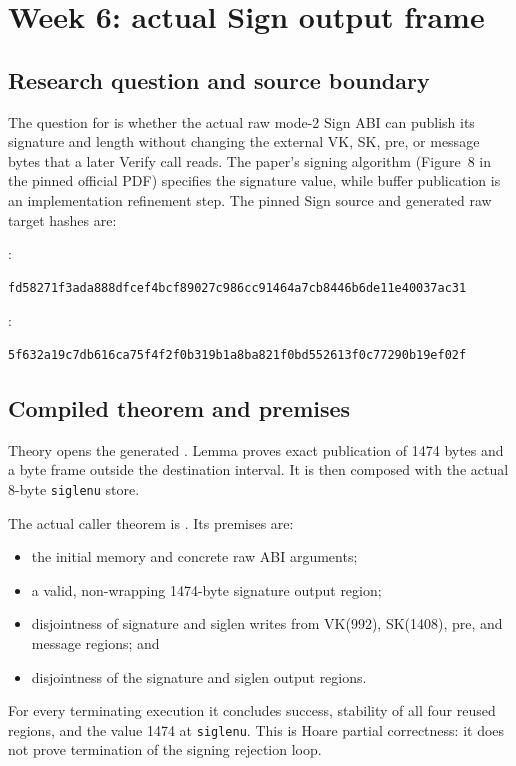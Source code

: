 \section{Week 6: actual Sign output frame}

\subsection{Research question and source boundary}

The question for  is whether the actual raw
mode-2 Sign ABI can publish its signature and length without changing the
external VK, SK, pre, or message bytes that a later Verify call reads. The
paper's signing algorithm (Figure~8 in the pinned official PDF) specifies the
signature value, while buffer publication is an implementation refinement
step. The pinned Sign source and generated raw target hashes are:

\noindent{}:
\begin{verbatim}
fd58271f3ada888dfcef4bcf89027c986cc91464a7cb8446b6de11e40037ac31
\end{verbatim}
\noindent{}:
\begin{verbatim}
5f632a19c7db616ca75f4f2f0b319b1a8ba821f0bd552613f0c77290b19ef02f
\end{verbatim}

\subsection{Compiled theorem and premises}

Theory  opens the generated
. Lemma
 proves exact publication
of 1474 bytes and a byte frame outside the destination interval. It is then
composed with the actual 8-byte \texttt{siglenu} store.

The actual caller theorem is
. Its premises are:
\begin{itemize}
  \item the initial memory and concrete raw ABI arguments;
  \item a valid, non-wrapping 1474-byte signature output region;
  \item disjointness of signature and siglen writes from VK(992), SK(1408),
        pre, and message regions; and
  \item disjointness of the signature and siglen output regions.
\end{itemize}
For every terminating execution it concludes success, stability of all four
reused regions, and the value 1474 at \texttt{siglenu}. This is Hoare partial
correctness: it does not prove termination of the signing rejection loop.


